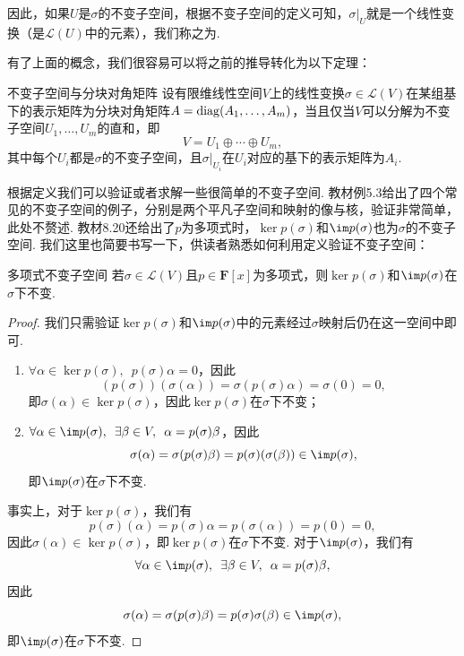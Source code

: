 因此，如果$U$是$\sigma$的不变子空间，根据不变子空间的定义可知，$\sigma\vert_U$就是一个线性变换（是$\mathcal{L}(U)$中的元素），我们称之为.

有了上面的概念，我们很容易可以将之前的推导转化为以下定理：
\begin{theorem}{}{不变子空间与分块对角矩阵}
    设有限维线性空间$V$上的线性变换$\sigma\in\mathcal{L}(V)$在某组基下的表示矩阵为分块对角矩阵$A=\operatorname{diag}(A_1,\ldots,A_m)$，当且仅当$V$可以分解为不变子空间$U_1,\ldots,U_m$的直和，即
    \[V=U_1\oplus\cdots\oplus U_m,\]
    其中每个$U_i$都是$\sigma$的不变子空间，且$\sigma\vert_{U_i}$在$U_i$对应的基下的表示矩阵为$A_i$.
\end{theorem}

根据定义我们可以验证或者求解一些很简单的不变子空间. 教材例5.3给出了四个常见的不变子空间的例子，分别是两个平凡子空间和映射的像与核，验证非常简单，此处不赘述. 教材8.20还给出了$p$为多项式时，$\ker p(\sigma)$和$\im p(\sigma)$也为$\sigma$的不变子空间. 我们这里也简要书写一下，供读者熟悉如何利用定义验证不变子空间：
\begin{example}{}{多项式不变子空间}
    若$\sigma\in\mathcal{L}(V)$且$p\in\mathbf{F}[x]$为多项式，则$\ker p(\sigma)$和$\im p(\sigma)$在$\sigma$下不变.
\end{example}

\begin{proof}
    我们只需验证$\ker p(\sigma)$和$\im p(\sigma)$中的元素经过$\sigma$映射后仍在这一空间中即可.
    \begin{enumerate}
        \item $\forall \alpha\in \ker p(\sigma),\enspace p(\sigma)\alpha=0$，因此
              \[(p(\sigma))(\sigma(\alpha))=\sigma(p(\sigma)\alpha)=\sigma(0)=0,\]
              即$\sigma(\alpha)\in \ker p(\sigma)$，因此$\ker p(\sigma)$在$\sigma$下不变；

        \item $\forall \alpha\in \im p(\sigma),\enspace \exists \beta\in V,\enspace \alpha=p(\sigma)\beta$，因此
              \[\sigma(\alpha)=\sigma(p(\sigma)\beta)=p(\sigma)(\sigma(\beta))\in \im p(\sigma),\]
              即$\im p(\sigma)$在$\sigma$下不变.
    \end{enumerate}
    事实上，对于$\ker p(\sigma)$，我们有
    \[ p(\sigma)(\alpha)=p(\sigma)\alpha=p(\sigma(\alpha))=p(0)=0,\]
    因此$\sigma(\alpha)\in \ker p(\sigma)$，即$\ker p(\sigma)$在$\sigma$下不变. 对于$\im p(\sigma)$，我们有
    \[\forall \alpha\in \im p(\sigma),\enspace \exists \beta\in V,\enspace \alpha=p(\sigma)\beta,\]
    因此
    \[\sigma(\alpha)=\sigma(p(\sigma)\beta)=p(\sigma)\sigma(\beta)\in \im p(\sigma),\]
    即$\im p(\sigma)$在$\sigma$下不变.
\end{proof}

